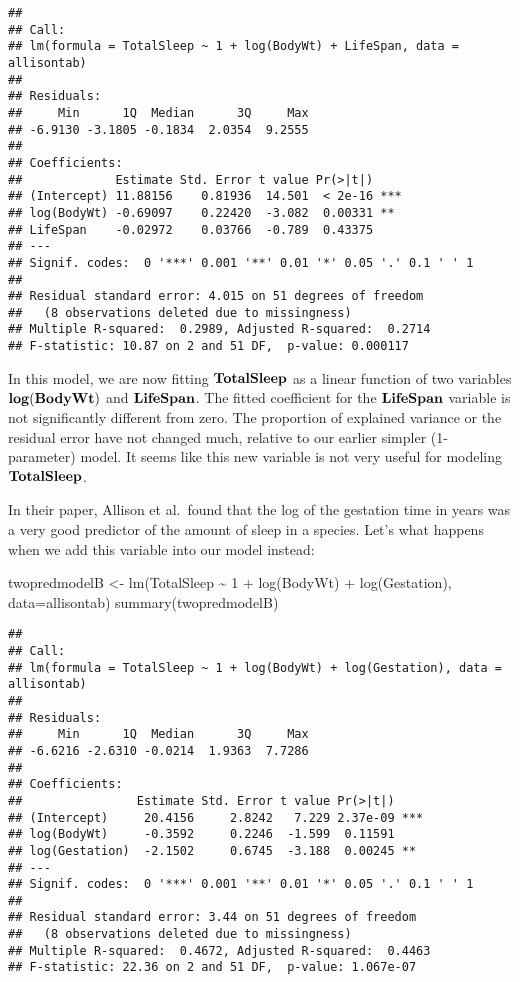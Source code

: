 \documentclass[
]{book}
\newenvironment{Shaded}{\begin{snugshade}}{\end{snugshade}}
\newcommand{\AttributeTok}[1]{\textcolor[rgb]{0.77,0.63,0.00}{#1}}
\newcommand{\DecValTok}[1]{\textcolor[rgb]{0.00,0.00,0.81}{#1}}
\newcommand{\FunctionTok}[1]{\textcolor[rgb]{0.00,0.00,0.00}{#1}}
\newcommand{\NormalTok}[1]{#1}
\newcommand{\OtherTok}[1]{\textcolor[rgb]{0.56,0.35,0.01}{#1}}
\newcommand{\SpecialCharTok}[1]{\textcolor[rgb]{0.00,0.00,0.00}{#1}}
\begin{document}
\begin{verbatim}
## 
## Call:
## lm(formula = TotalSleep ~ 1 + log(BodyWt) + LifeSpan, data = allisontab)
## 
## Residuals:
##     Min      1Q  Median      3Q     Max 
## -6.9130 -3.1805 -0.1834  2.0354  9.2555 
## 
## Coefficients:
##             Estimate Std. Error t value Pr(>|t|)    
## (Intercept) 11.88156    0.81936  14.501  < 2e-16 ***
## log(BodyWt) -0.69097    0.22420  -3.082  0.00331 ** 
## LifeSpan    -0.02972    0.03766  -0.789  0.43375    
## ---
## Signif. codes:  0 '***' 0.001 '**' 0.01 '*' 0.05 '.' 0.1 ' ' 1
## 
## Residual standard error: 4.015 on 51 degrees of freedom
##   (8 observations deleted due to missingness)
## Multiple R-squared:  0.2989, Adjusted R-squared:  0.2714 
## F-statistic: 10.87 on 2 and 51 DF,  p-value: 0.000117
\end{verbatim}

In this model, we are now fitting \(\bf{TotalSleep}\) as a linear function of two variables \(\bf{log(BodyWt)}\) and \(\bf{LifeSpan}\). The fitted coefficient for the \(\bf{LifeSpan}\) variable is not significantly different from zero. The proportion of explained variance or the residual error have not changed much, relative to our earlier simpler (1-parameter) model. It seems like this new variable is not very useful for modeling \(\bf{TotalSleep}\).

In their paper, Allison et al.~found that the log of the gestation time in years was a very good predictor of the amount of sleep in a species. Let's what happens when we add this variable into our model instead:

\begin{Shaded}
\begin{Highlighting}[]
\NormalTok{twopredmodelB }\OtherTok{\textless{}{-}} \FunctionTok{lm}\NormalTok{(TotalSleep }\SpecialCharTok{\textasciitilde{}} \DecValTok{1} \SpecialCharTok{+} \FunctionTok{log}\NormalTok{(BodyWt) }\SpecialCharTok{+} \FunctionTok{log}\NormalTok{(Gestation), }\AttributeTok{data=}\NormalTok{allisontab)}
\FunctionTok{summary}\NormalTok{(twopredmodelB)}
\end{Highlighting}
\end{Shaded}

\begin{verbatim}
## 
## Call:
## lm(formula = TotalSleep ~ 1 + log(BodyWt) + log(Gestation), data = allisontab)
## 
## Residuals:
##     Min      1Q  Median      3Q     Max 
## -6.6216 -2.6310 -0.0214  1.9363  7.7286 
## 
## Coefficients:
##                Estimate Std. Error t value Pr(>|t|)    
## (Intercept)     20.4156     2.8242   7.229 2.37e-09 ***
## log(BodyWt)     -0.3592     0.2246  -1.599  0.11591    
## log(Gestation)  -2.1502     0.6745  -3.188  0.00245 ** 
## ---
## Signif. codes:  0 '***' 0.001 '**' 0.01 '*' 0.05 '.' 0.1 ' ' 1
## 
## Residual standard error: 3.44 on 51 degrees of freedom
##   (8 observations deleted due to missingness)
## Multiple R-squared:  0.4672, Adjusted R-squared:  0.4463 
## F-statistic: 22.36 on 2 and 51 DF,  p-value: 1.067e-07
\end{verbatim}
\end{document}
